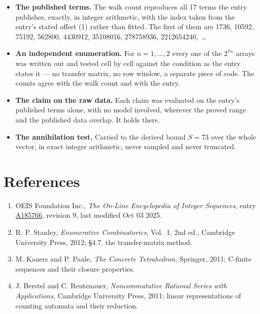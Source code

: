 \documentclass[11pt]{article}
\theoremstyle{definition}
\begin{document}
\begin{itemize}

\item {\bfseries The published terms.} The walk count reproduces all 17 terms the entry publishes, exactly, in integer arithmetic, with the index taken from the entry's stated offset (1) rather than fitted. The first of them are 1736, 10592, 75192, 562800, 4430912, 35108016, 278758936, 2212654240,~\dots

\item {\bfseries An independent enumeration.} For $n = 1,\dots,2$ every one of the $2^{7n}$ arrays was written out and tested cell by cell against the condition as the entry states it --- no transfer matrix, no row window, a separate piece of code. The counts agree with the walk count and with the entry.

\item {\bfseries The claim on the raw data.} Each claim was evaluated on the entry's published terms alone, with no model involved, wherever the proved range and the published data overlap. It holds there.

\item {\bfseries The annihilation test.} Carried to the derived bound $S = 73$ over the whole vector, in exact integer arithmetic, never sampled and never truncated.

\end{itemize}

\section{References}

\begin{enumerate}

\item OEIS Foundation Inc., \emph{The On-Line Encyclopedia of Integer Sequences}, entry \href{https://oeis.org/A185766}{A185766}, revision 9, last modified Oct 03 2025.

\item R. P. Stanley, \emph{Enumerative Combinatorics}, Vol.~1, 2nd ed., Cambridge University Press, 2012; \S4.7, the transfer-matrix method.

\item M. Kauers and P. Paule, \emph{The Concrete Tetrahedron}, Springer, 2011; C-finite sequences and their closure properties.

\item J. Berstel and C. Reutenauer, \emph{Noncommutative Rational Series with Applications}, Cambridge University Press, 2011; linear representations of counting automata and their reduction.

\end{enumerate}
\end{document}

